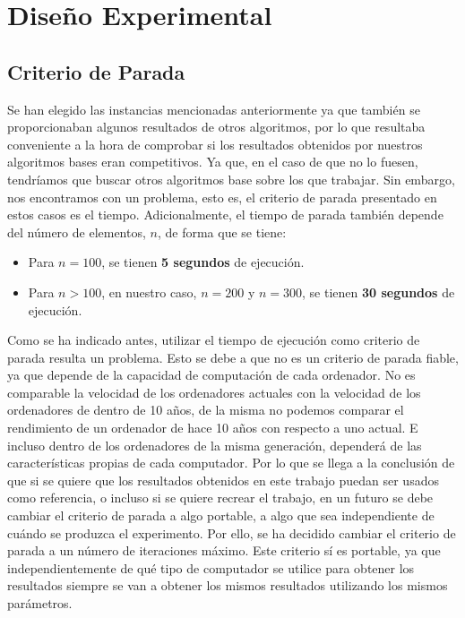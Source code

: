 
\section{Diseño Experimental}

\subsection{Criterio de Parada}

Se han elegido las instancias mencionadas anteriormente ya que también se proporcionaban algunos resultados de otros algoritmos, por lo que resultaba conveniente a la hora de comprobar si los resultados obtenidos por nuestros algoritmos bases eran competitivos. 
Ya que, en el caso de que no lo fuesen, tendríamos que buscar otros algoritmos base sobre los que trabajar.
Sin embargo, nos encontramos con un problema, esto es, el criterio de parada presentado en estos casos es el tiempo.
Adicionalmente, el tiempo de parada también depende del número de elementos, $n$, de forma que se tiene:
\begin{itemize}
\item Para $n = 100$, se tienen \textbf{5 segundos} de ejecución.
\item Para $n > 100$, en nuestro caso, $n = 200$ y $n = 300$, se tienen \textbf{30 segundos} de ejecución.
\end{itemize}

Como se ha indicado antes, utilizar el tiempo de ejecución como criterio de parada resulta un problema. 
Esto se debe a que no es un criterio de parada fiable, ya que depende de la capacidad de computación de cada ordenador. 
No es comparable la velocidad de los ordenadores actuales con la velocidad de los ordenadores de dentro de 10 años, de la misma no podemos comparar el rendimiento de un ordenador de hace 10 años con respecto a uno actual. 
E incluso dentro de los ordenadores de la misma generación, dependerá de las características propias de cada computador. 
Por lo que se llega a la conclusión de que si se quiere que los resultados obtenidos en este trabajo puedan ser usados como referencia, o incluso si se quiere recrear el trabajo, en un futuro se debe cambiar el criterio de parada a algo portable, a algo que sea independiente de cuándo se produzca el experimento. 
Por ello, se ha decidido cambiar el criterio de parada a un número de iteraciones máximo. 
Este criterio sí es portable, ya que independientemente de qué tipo de computador se utilice para obtener los resultados siempre se van a obtener los mismos resultados utilizando los mismos parámetros.

